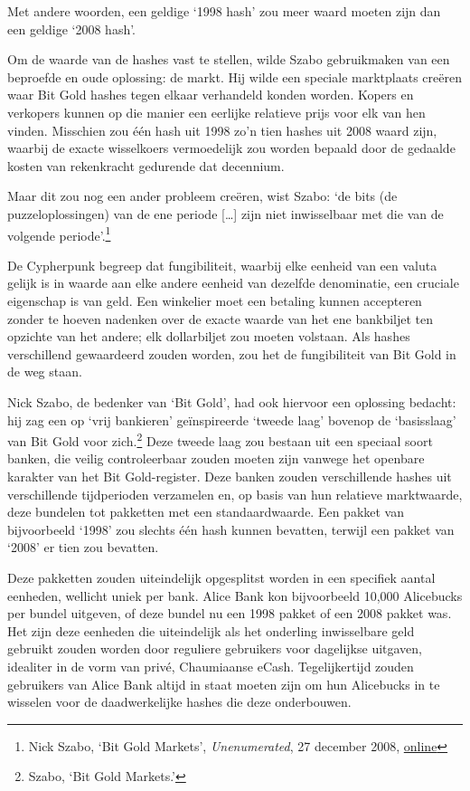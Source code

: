 \documentclass[smalldemyvopaper,11pt,twoside,onecolumn,openright,extrafontsizes,hidelinks]{memoir}
\begin{document}
Met andere woorden, een geldige `1998 hash' zou meer waard moeten zijn
dan een geldige `2008 hash'.

Om de waarde van de hashes vast te stellen, wilde Szabo gebruikmaken van
een beproefde en oude oplossing: de markt. Hij wilde een speciale
marktplaats creëren waar Bit Gold hashes tegen elkaar verhandeld konden
worden. Kopers en verkopers kunnen op die manier een eerlijke relatieve
prijs voor elk van hen vinden. Misschien zou één hash uit 1998 zo'n tien
hashes uit 2008 waard zijn, waarbij de exacte wisselkoers vermoedelijk
zou worden bepaald door de gedaalde kosten van rekenkracht gedurende dat
decennium.

Maar dit zou nog een ander probleem creëren, wist Szabo: `de bits (de
puzzeloplossingen) van de ene periode {[}\ldots{]} zijn niet
inwisselbaar met die van de volgende periode'.\footnote{Nick Szabo, `Bit
  Gold Markets', \emph{Unenumerated}, 27 december 2008,
  \href{https://unenumerated.blogspot.com/2008/04/bit-gold-markets.html}{online}}

De Cypherpunk begreep dat fungibiliteit, waarbij elke eenheid van een
valuta gelijk is in waarde aan elke andere eenheid van dezelfde
denominatie, een cruciale eigenschap is van geld. Een winkelier moet een
betaling kunnen accepteren zonder te hoeven nadenken over de exacte
waarde van het ene bankbiljet ten opzichte van het andere; elk
dollarbiljet zou moeten volstaan. Als hashes verschillend gewaardeerd
zouden worden, zou het de fungibiliteit van Bit Gold in de weg staan.

Nick Szabo, de bedenker van `Bit Gold', had ook hiervoor een oplossing
bedacht: hij zag een op `vrij bankieren' geïnspireerde `tweede laag'
bovenop de `basisslaag' van Bit Gold voor zich.\footnote{Szabo, `Bit
  Gold Markets.'} Deze tweede laag zou bestaan uit een speciaal soort
banken, die veilig controleerbaar zouden moeten zijn vanwege het
openbare karakter van het Bit Gold-register. Deze banken zouden
verschillende hashes uit verschillende tijdperioden verzamelen en, op
basis van hun relatieve marktwaarde, deze bundelen tot pakketten met een
standaardwaarde. Een pakket van bijvoorbeeld `1998' zou slechts één hash
kunnen bevatten, terwijl een pakket van `2008' er tien zou bevatten.

Deze pakketten zouden uiteindelijk opgesplitst worden in een specifiek
aantal eenheden, wellicht uniek per bank. Alice Bank kon bijvoorbeeld
10,000 Alicebucks per bundel uitgeven, of deze bundel nu een 1998 pakket
of een 2008 pakket was. Het zijn deze eenheden die uiteindelijk als het
onderling inwisselbare geld gebruikt zouden worden door reguliere
gebruikers voor dagelijkse uitgaven, idealiter in de vorm van privé,
Chaumiaanse eCash. Tegelijkertijd zouden gebruikers van Alice Bank
altijd in staat moeten zijn om hun Alicebucks in te wisselen voor de
daadwerkelijke hashes die deze onderbouwen.
\end{document}
